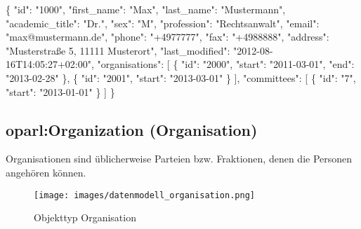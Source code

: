 \documentclass[,a4paper]{article}
\makeatletter
\newenvironment{Shaded}{}{}
\newcommand{\DataTypeTok}[1]{\textcolor[rgb]{0.56,0.13,0.00}{{#1}}}
\newcommand{\StringTok}[1]{\textcolor[rgb]{0.25,0.44,0.63}{{#1}}}
\newcommand{\NormalTok}[1]{{#1}}
\def\maxwidth{\ifdim\Gin@nat@width>\linewidth\linewidth
\else\Gin@nat@width\fi}
\let\Oldincludegraphics\includegraphics
\renewcommand{\includegraphics}[1]{\Oldincludegraphics[width=\maxwidth]{#1}}
\makeatother
\begin{document}
\begin{Shaded}
\begin{Highlighting}[]
\NormalTok{\{}
    \DataTypeTok{"id"}\NormalTok{: }\StringTok{"1000"}\NormalTok{,}
    \DataTypeTok{"first_name"}\NormalTok{: }\StringTok{"Max"}\NormalTok{,}
    \DataTypeTok{"last_name"}\NormalTok{: }\StringTok{"Mustermann"}\NormalTok{,}
    \DataTypeTok{"academic_title"}\NormalTok{: }\StringTok{"Dr."}\NormalTok{,}
    \DataTypeTok{"sex"}\NormalTok{: }\StringTok{"M"}\NormalTok{,}
    \DataTypeTok{"profession"}\NormalTok{: }\StringTok{"Rechtsanwalt"}\NormalTok{,}
    \DataTypeTok{"email"}\NormalTok{: }\StringTok{"max@mustermann.de"}\NormalTok{,}
    \DataTypeTok{"phone"}\NormalTok{: }\StringTok{"+4977777"}\NormalTok{,}
    \DataTypeTok{"fax"}\NormalTok{: }\StringTok{"+4988888"}\NormalTok{,}
    \DataTypeTok{"address"}\NormalTok{: }\StringTok{"Musterstraße 5, 11111 Musterort"}\NormalTok{,}
    \DataTypeTok{"last_modified"}\NormalTok{: }\StringTok{"2012-08-16T14:05:27+02:00"}\NormalTok{,}
    \DataTypeTok{"organisations"}\NormalTok{: [}
        \NormalTok{\{}
            \DataTypeTok{"id"}\NormalTok{: }\StringTok{"2000"}\NormalTok{,}
            \DataTypeTok{"start"}\NormalTok{: }\StringTok{"2011-03-01"}\NormalTok{,}
            \DataTypeTok{"end"}\NormalTok{: }\StringTok{"2013-02-28"}
        \NormalTok{\},}
        \NormalTok{\{}
            \DataTypeTok{"id"}\NormalTok{: }\StringTok{"2001"}\NormalTok{,}
            \DataTypeTok{"start"}\NormalTok{: }\StringTok{"2013-03-01"}
        \NormalTok{\}}
    \NormalTok{],}
    \DataTypeTok{"committees"}\NormalTok{: [}
        \NormalTok{\{}
            \DataTypeTok{"id"}\NormalTok{: }\StringTok{"7"}\NormalTok{,}
            \DataTypeTok{"start"}\NormalTok{: }\StringTok{"2013-01-01"}
        \NormalTok{\}}
    \NormalTok{]}
\NormalTok{\}}
\end{Highlighting}
\end{Shaded}

\subsection{oparl:Organization (Organisation)}

Organisationen sind üblicherweise Parteien bzw. Fraktionen, denen die
Personen angehören können.

\begin{figure}[htbp]
\centering
\texttt{[image: images/datenmodell\_organisation.png]}
\caption{Objekttyp Organisation}
\end{figure}
\end{document}
